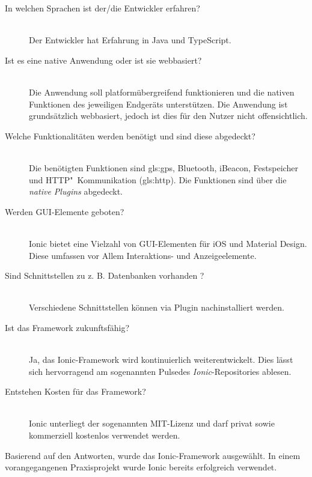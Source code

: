 \begin{description}
\item[In welchen Sprachen ist der/die Entwickler erfahren?] \hfill \\
Der Entwickler hat Erfahrung in Java und TypeScript. 

\item[Ist es eine native Anwendung oder ist sie webbasiert?] \hfill \\
Die Anwendung soll platformübergreifend funktionieren und die nativen Funktionen des jeweiligen Endgeräts unterstützen. Die Anwendung ist grundsätzlich webbasiert, jedoch ist dies für den Nutzer nicht offensichtlich.

\item[Welche Funktionalitäten werden benötigt und sind diese abgedeckt?] \hfill \\
Die benötigten Funktionen sind \gls{gls:gps}, Bluetooth, iBeacon, Festspeicher und \newline HTTP"~Kommunikation (\gls{gls:http}). Die Funktionen sind über die \emph{native Plugins} abgedeckt.

\item[Werden GUI-Elemente geboten?] \hfill \\
Ionic bietet eine Vielzahl von GUI-Elementen für iOS und Material Design. Diese umfassen vor Allem Interaktions- und Anzeigeelemente. \cite{ionicGUI}

\item[Sind Schnittstellen zu z. B. Datenbanken vorhanden ?] \hfill \\
Verschiedene Schnittstellen können via Plugin nachinstalliert werden.

\item[Ist das Framework zukunftsfähig?] \hfill \\
Ja, das Ionic-Framework wird kontinuierlich weiterentwickelt. Dies lässt sich hervorragend am sogenannten \glqq Pulse\grqq des \emph{Ionic}-Repositories ablesen. \cite{IonicPulses}

\item[Entstehen Kosten für das Framework?] \hfil \\
Ionic unterliegt der sogenannten MIT-Lizenz \cite{mitlizenz} und darf privat sowie kommerziell kostenlos verwendet werden.
\end{description}


Basierend auf den Antworten, wurde das Ionic-Framework ausgewählt. In einem vorangegangenen Praxisprojekt \cite{PraxBerJoSc} wurde Ionic bereits erfolgreich verwendet.


